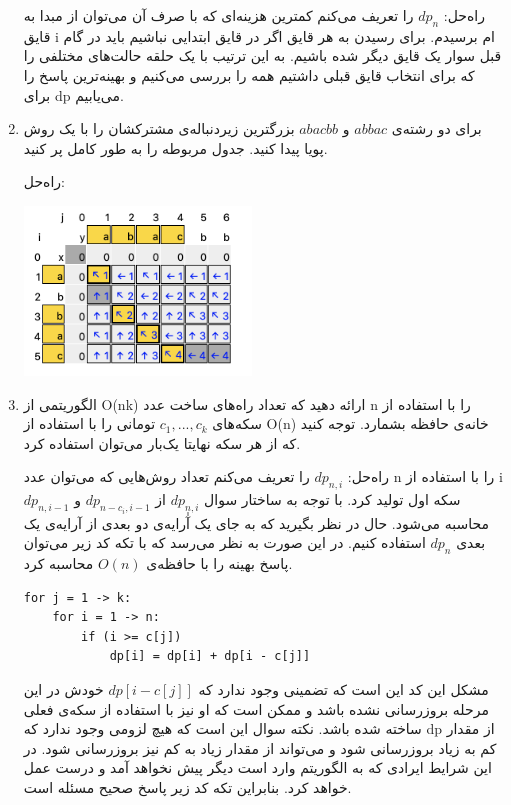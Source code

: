 \documentclass{article}
\begin{document}
\begin{enumerate}
راه‌حل: $dp_n$ را تعریف می‌کنم کمترین هزینه‌ای که با صرف آن می‌توان از مبدا به قایق i ام برسیدم. برای رسیدن به هر قایق اگر در قایق ابتدایی نباشیم باید در گام قبل سوار یک قایق دیگر شده باشیم. به این ترتیب با یک حلقه حالت‌های مختلفی را که برای انتخاب قایق قبلی داشتیم همه را بررسی می‌کنیم و بهینه‌ترین پاسخ را برای dp می‌یابیم.
\item برای دو رشته‌ی $abbac$ و $abacbb$ بزرگترین زیردنباله‌ی مشترکشان را با یک روش پویا پیدا کنید. جدول مربوطه را به طور کامل پر کنید.

راه‌حل:

\includegraphics[height=4.5cm]{./grid.png}
\item
الگوریتمی از O(nk) ارائه دهید 
که تعداد راه‌های ساخت عدد n را با استفاده از سکه‌های $c_1, ..., c_k$ تومانی را با استفاده از O(n) خانه‌ی حافظه بشمارد. توجه کنید که از هر سکه نهایتا یک‌بار می‌توان استفاده کرد.

راه‌حل: $dp_{n,i}$ را تعریف می‌کنم تعداد روش‌هایی که می‌توان عدد n را با استفاده از i سکه اول تولید کرد. با توجه به ساختار سوال $dp_{n,i}$ از $dp_{n-c_i, i-1}$ و $dp_{n, i-1}$ محاسبه می‌شود. حال در نظر بگیرید که به جای یک آٰرایه‌ی دو بعدی از آرایه‌ی یک بعدی $dp_n$ استفاده کنیم. در این صورت به نظر می‌رسد که با تکه کد زیر می‌توان پاسخ بهینه را با حافظه‌ی $O(n)$ محاسبه کرد.

\begin{verbatim}
for j = 1 -> k:
    for i = 1 -> n:
        if (i >= c[j])
            dp[i] = dp[i] + dp[i - c[j]]
\end{verbatim}

مشکل این کد این است که تضمینی وجود ندارد که $dp[i-c[j]]$ خودش در این مرحله بروزرسانی نشده باشد و ممکن است که او نیز با استفاده از سکه‌ی فعلی ساخته شده باشد. نکته سوال این است که هیچ لزومی وجود ندارد که dp از مقدار کم به زیاد بروزرسانی شود و می‌تواند از مقدار زیاد به کم نیز بروزرسانی شود. در این شرایط ایرادی که به الگوریتم وارد است دیگر پیش نخواهد آمد و درست عمل خواهد کرد. بنابراین تکه کد زیر پاسخ صحیح مسئله است.


\end{enumerate}
\end{document}
